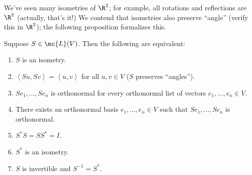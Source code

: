\documentclass[math0540-lecture-notes.tex]{subfiles}
\begin{document}
We've seen many isometries of $\R^2$; for example, all rotations and reflections are $\R^2$
(actually, that's it!) We contend that isometries also preserve ``angle'' (verify this in $\R^2$);
the following proposition formalizes this.
\begin{proposition}{}
  Suppose $S\in \mc{L}(V)$. Then the following are equivalent:
  \begin{enumerate}
    \item $S$ is an isometry.
    \item $\left<Su,Sv \right> =\left<u,v \right> $ for all $u,v\in V$ ($S$ preserves ``angles'').
    \item $Se_1,\ldots,Se_n$ is orthonormal for every orthonormal list of vectors
      $e_1,\ldots,e_n\in V$.
    \item There exists an orthonormal basis $e_1,\ldots,e_n\in V$ such that $Se_1,\ldots,Se_n$ is
      orthonormal.
    \item $S^*S=S S^*=I$.
    \item $S^*$ is an isometry.
    \item $S$ is invertible and $S^{-1}=S^*$.
  \end{enumerate}
\end{proposition}
\end{document}
